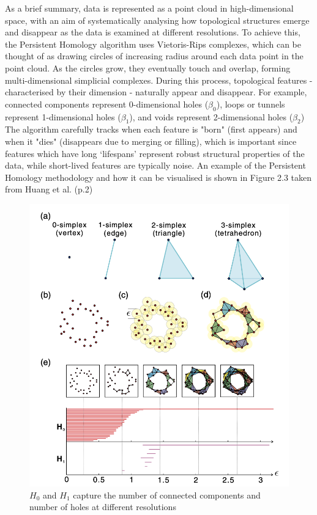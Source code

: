 \documentclass[12pt,twoside]{report}
\begin{document}
As a brief summary, data is represented as a point cloud in high-dimensional space, with an aim of systematically analysing how topological structures emerge and disappear as the data is examined at different resolutions. To achieve this, the Persistent Homology algorithm uses Vietoris-Rips complexes, which can be thought of as drawing circles of increasing radius around each data point in the point cloud. As the circles grow, they eventually touch and overlap, forming multi-dimensional simplicial complexes. During this process, topological features - characterised by their dimension - naturally appear and disappear. For example, connected components represent 0-dimensional holes ($\beta_0$), loops or tunnels represent 1-dimensional holes ($\beta_1$), and voids represent 2-dimensional holes ($\beta_2$) The algorithm carefully tracks when each feature is "born" (first appears) and when it "dies" (disappears due to merging or filling), which is important since features which have long `lifespans' represent robust structural properties of the data, while short-lived features are typically noise. An example of the Persistent Homology methodology and how it can be visualised is shown in Figure 2.3 taken from Huang et al. (p.2)

\begin{figure}[H]
\centering
\includegraphics[height = 0.3\textheight]{./figures/PersistentHomology.png}
\caption{$H_0$ and $H_1$ capture the number of connected components and number of holes at different resolutions}
\label{fig:PersistentHomology}
\end{figure}
\end{document}
